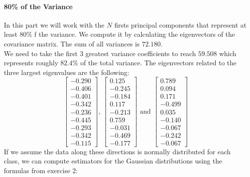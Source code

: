 \documentclass[a4paper, 10pt]{article}
\begin{document}
\paragraph{80\% of the Variance}
In this part we will work with the $N$ firsts principal components that represent at least $80\%$ f the variance. 
We compute it by calculating the eigenvectors of the covariance matrix. The sum of all variances is $72.180$.
\\
We need to take the first 3 greatest variance coefficients to reach $59.508$ which represents roughly $82.4\%$ of the total variance.
The eigenvectors related to the three largest eigenvalues are the following:
$$
\begin{bmatrix}
    -0.290\\
    -0.406\\
    -0.401\\
    -0.342\\
    -0.236\\
    -0.445\\
    -0.293\\
    -0.342\\
    -0.115
\end{bmatrix}\text{, } \begin{bmatrix}
    0.125\\
   -0.245\\
   -0.184\\
    0.117\\
   -0.213\\
    0.759\\
   -0.031\\
   -0.469\\
   -0.177
\end{bmatrix} \text{ and }\begin{bmatrix}
    0.789\\
    0.094\\
    0.171\\
    -0.499\\
    0.035\\
    -0.140\\
    -0.067\\
    -0.242\\
    -0.067
\end{bmatrix}
$$
If we assume the data along these directions is normally distributed for each class, we can compute
estimators for the Gaussian distributions using the formulas from exercise 2:
\end{document}
